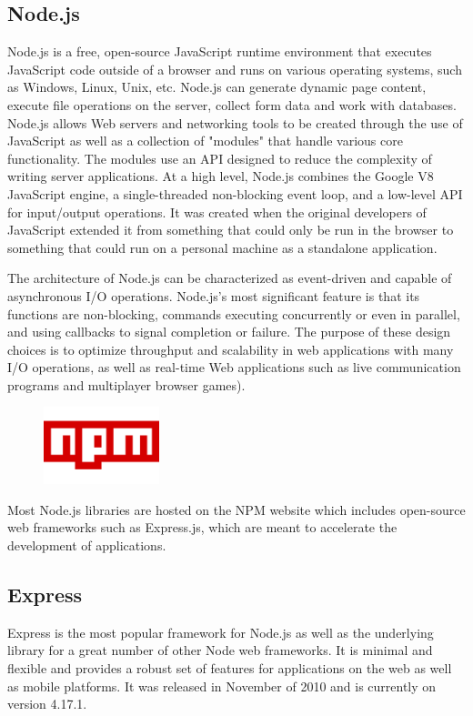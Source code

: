 \documentclass{report}
\begin{document}
\subsection {Node.js}
Node.js is a free, open-source JavaScript runtime environment that executes JavaScript code outside of a browser and runs on various operating systems, such as Windows, Linux, Unix, etc. Node.js can generate dynamic page content, execute file operations on the server, collect form data and work with databases. Node.js allows Web servers and networking tools to be created through the use of JavaScript as well as a collection of "modules" that handle various core functionality. The modules use an API designed to reduce the complexity of writing server applications. At a high level, Node.js combines the Google V8 JavaScript engine, a single-threaded non-blocking event loop, and a low-level API for input/output operations. It was created when the original developers of JavaScript extended it from something that could only be run in the browser to something that could run on a personal machine as a standalone application.\par

The architecture of Node.js can be characterized as event-driven and capable of asynchronous I/O operations. Node.js's most significant feature is that its functions are non-blocking, commands executing concurrently or even in parallel, and using callbacks to signal completion or failure. The purpose of these design choices is to optimize throughput and scalability in web applications with many I/O operations, as well as real-time Web applications such as live communication programs and multiplayer browser games). \par
\begin{figure}
	\vspace*{-1cm}
    \centering
    \includegraphics[width=0.3\textwidth]{npm}
	\vspace{-10pt} 
\end{figure}
Most Node.js libraries are hosted on the NPM website which includes open-source web frameworks such as Express.js, which are meant to accelerate the development of applications. 

\subsection {Express}
Express is the most popular framework for Node.js as well as the underlying library for a great number of other Node web frameworks. It is minimal and flexible and provides a robust set of features for applications on the web as well as mobile platforms. It was released in November of 2010 and is currently on version 4.17.1.\par
\end{document}
